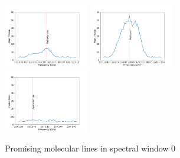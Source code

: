 \documentclass{aa}
\begin{document}
\begin{figure}
    \includegraphics[width=0.33\textwidth]{spw0_CH3NH2}
    \includegraphics[width=0.33\textwidth]{spw0_CH3OH}
    \includegraphics[width=0.33\textwidth]{spw0_CH3CHO}
    
    \caption{Promising molecular lines in spectral window 0}
    
   \end{figure}
\end{document}
